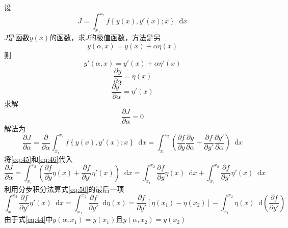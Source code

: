 \documentclass{article}
\newcommand*{\dif}{\mathop{}\!\mathrm{d}}
\begin{document}
设
\begin{equation}
  \label{eq:43}
  J = \int_{x_{1}}^{x_{2}} f \left\{ y(x),y'(x);x  \right\} \dif x
\end{equation}
$J$是函数$y(x)$的函数，求$J$的极值函数，方法是另
\begin{equation}
  \label{eq:44}
  y \left( \alpha ,x \right) = y(x) + \alpha \eta (x)
\end{equation}
则
\begin{equation}
  \label{eq:45}
  y' \left( \alpha ,x \right) = y'(x) + \alpha \eta' (x)
\end{equation}
\begin{equation}
  \label{eq:46}
  \frac{\partial y}{\partial \alpha} = \eta (x)
\end{equation}
\begin{equation}
  \label{eq:47}
  \frac{\partial y'}{\partial \alpha} = \eta' (x)
\end{equation}
求解
\begin{equation}
  \label{eq:48}
  \frac{\partial J}{\partial \alpha} = 0
\end{equation}
解法为
\begin{equation}
  \label{eq:49}
  \frac{\partial J}{\partial \alpha} = \frac{\partial}{\partial \alpha} \int_{x_{1}}^{x_{2}} f \left\{ y(x),y'(x);x  \right\} \dif x =  \int_{x_{1}}^{x_{2}} \left( \frac{\partial f}{\partial y} \frac{\partial y}{\partial \alpha} + \frac{\partial f}{\partial y'} \frac{\partial y'}{\partial \alpha} \right) \dif x
\end{equation}
将\ref{eq:45}和\ref{eq:46}代入
\begin{equation}
  \label{eq:50}
  \frac{\partial J}{\partial \alpha} = \int_{x_{1}}^{x_{2}} \left( \frac{\partial f}{\partial y} \eta (x) + \frac{\partial f}{\partial y'} \eta' (x) \right) \dif x = \int_{x_{1}}^{x_{2}} \frac{\partial f}{\partial y} \eta (x) \dif x + \int_{x_{1}}^{x_{2}} \frac{\partial f}{\partial y'} \eta' (x) \dif x
\end{equation}
利用分步积分法算式\ref{eq:50}的最后一项
\begin{equation}
  \label{eq:51}
   \int_{x_{1}}^{x_{2}} \frac{\partial f}{\partial y'} \eta'(x) \dif x =  \int_{x_{1}}^{x_{2}} \frac{\partial f}{\partial y'} \dif \eta (x) = \frac{\partial f}{\partial y'} \left[ \eta (x_{1}) - \eta (x_{2}) \right] - \int_{x_{1}}^{x_{2}} \eta (x) \dif \left( \frac{\partial f}{\partial y'} \right)
 \end{equation}
 由于式\ref{eq:44}中$y(\alpha,x_{1}) = y(x_{1})$且$y(\alpha,x_{2}) = y(x_{2})$
\end{document}
